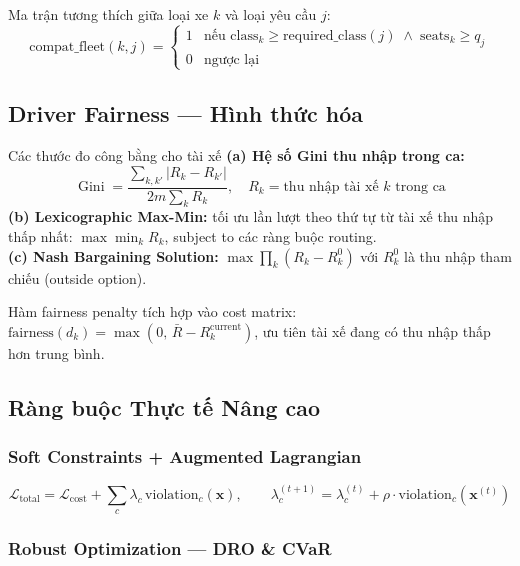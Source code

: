 \documentclass[12pt,a4paper]{article}
\DeclareMathOperator{\Gini}{Gini}
\begin{document}
Ma trận tương thích giữa loại xe $k$ và loại yêu cầu $j$:
\begin{equation}
  \mathrm{compat\_fleet}(k,j) =
  \begin{cases}
    1 & \text{nếu }\mathrm{class}_k \geq \mathrm{required\_class}(j)
        \;\wedge\; \mathrm{seats}_k \geq q_j\\
    0 & \text{ngược lại}
  \end{cases}
\end{equation}

\subsection{Driver Fairness --- Hình thức hóa}

\begin{formulabox}{Các thước đo công bằng cho tài xế}
\textbf{(a) Hệ số Gini thu nhập trong ca:}
\begin{equation}
  \Gini = \frac{\sum_{k,k'}|R_k - R_{k'}|}{2m\sum_k R_k},
  \quad R_k = \text{thu nhập tài xế } k \text{ trong ca}
\end{equation}
\textbf{(b) Lexicographic Max-Min:} tối ưu lần lượt theo thứ tự từ tài xế
thu nhập thấp nhất:
$\max\min_k R_k$, subject to các ràng buộc routing.\\
\textbf{(c) Nash Bargaining Solution:}
$\max\prod_k(R_k - R_k^0)$ với $R_k^0$ là thu nhập tham chiếu (outside option).
\end{formulabox}

Hàm fairness penalty tích hợp vào cost matrix:
$\mathrm{fairness}(d_k) = \max(0,\,\bar{R} - R_k^{\mathrm{current}})$,
ưu tiên tài xế đang có thu nhập thấp hơn trung bình.

\subsection{Ràng buộc Thực tế Nâng cao}

\subsubsection{Soft Constraints + Augmented Lagrangian}
\begin{equation}
  \mathcal{L}_{\mathrm{total}}
  = \mathcal{L}_{\mathrm{cost}}+\sum_c\lambda_c\,\mathrm{violation}_c(\bm{x}),
  \qquad
  \lambda_c^{(t+1)}=\lambda_c^{(t)}+\rho\cdot\mathrm{violation}_c(\bm{x}^{(t)})
\end{equation}

\subsubsection{Robust Optimization --- DRO \& CVaR}
\end{document}
